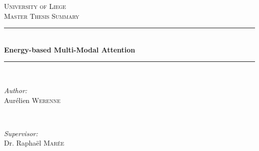 \documentclass[12pt]{report}
\begin{document}
\begin{titlepage}
\newcommand{\HRule}{\rule{\linewidth}{0.5mm}} %

\center %
 

\textsc{\LARGE University of Liege}\\[1.5cm] %
\textsc{\Large Master Thesis Summary}\\[1cm] %


\HRule \\[0.4cm]
{ \huge \bfseries Energy-based Multi-Modal Attention}\\[0.4cm] %
\HRule \\[1.5cm]
 

\begin{minipage}{0.4\textwidth}
\begin{flushleft} \large
\emph{Author:}\\
Aurélien \textsc{Werenne } %
\end{flushleft}
\end{minipage}
~
\begin{minipage}{0.4\textwidth}
\begin{flushright} \large
\emph{Supervisor:} \\
Dr. Raphaël \textsc{Marée} %
\end{flushright}
\end{minipage}\\[2cm]



\end{titlepage}
\end{document}
